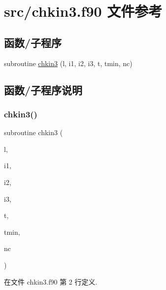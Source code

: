 \hypertarget{chkin3_8f90}{}\section{src/chkin3.f90 文件参考}
\label{chkin3_8f90}
\subsection*{函数/子程序}
\begin{DoxyCompactItemize}
\item 
subroutine \mbox{\hyperlink{chkin3_8f90_aa60153be44118756d9a942977f2214e0}{chkin3}} (l, i1, i2, i3, t, tmin, nc)
\end{DoxyCompactItemize}


\subsection{函数/子程序说明}
\mbox{\label{chkin3_8f90_aa60153be44118756d9a942977f2214e0}} 
\subsubsection{\texorpdfstring{chkin3()}{chkin3()}}
{\footnotesize\ttfamily subroutine chkin3 (\begin{DoxyParamCaption}\item[{}]{l,  }\item[{}]{i1,  }\item[{}]{i2,  }\item[{}]{i3,  }\item[{}]{t,  }\item[{}]{tmin,  }\item[{}]{nc }\end{DoxyParamCaption})}



在文件 chkin3.\+f90 第 2 行定义.

